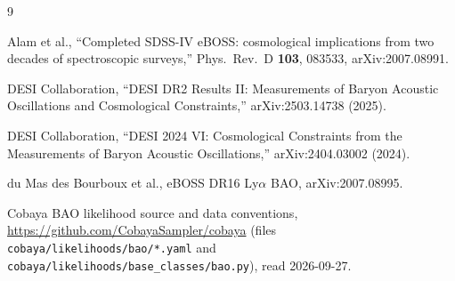 \documentclass[11pt]{article}
\begin{document}
\begin{thebibliography}{9}

Alam et al., ``Completed SDSS-IV eBOSS: cosmological implications from two
decades of spectroscopic surveys,'' Phys.\ Rev.\ D \textbf{103}, 083533,
arXiv:2007.08991.

DESI Collaboration, ``DESI DR2 Results II: Measurements of Baryon Acoustic
Oscillations and Cosmological Constraints,'' arXiv:2503.14738 (2025).

DESI Collaboration, ``DESI 2024 VI: Cosmological Constraints from the
Measurements of Baryon Acoustic Oscillations,'' arXiv:2404.03002 (2024).

du Mas des Bourboux et al., eBOSS DR16 Ly$\alpha$ BAO, arXiv:2007.08995.

Cobaya BAO likelihood source and data conventions,
\url{https://github.com/CobayaSampler/cobaya} (files
\texttt{cobaya/likelihoods/bao/*.yaml} and
\texttt{cobaya/likelihoods/base\_classes/bao.py}), read 2026-09-27.

\end{thebibliography}
\end{document}
